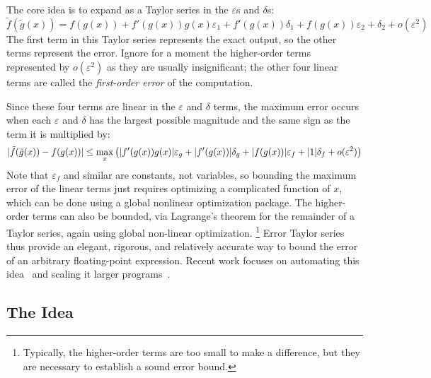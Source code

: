 \documentclass[paper.tex]{subfiles}
\begin{document}
The core idea is to expand 
  as a Taylor series in the $\varepsilon$s and $\delta$s:
\[
\tilde{f}(\tilde{g}(x)) =
f(g(x)) + f'(g(x))g(x)\varepsilon_1 + f'(g(x))\delta_1
+ f(g(x))\varepsilon_2 + \delta_2 + o(\varepsilon^2)
\]
The first term in this Taylor series represents the exact output,
  so the other terms represent the error.
Ignore for a moment the higher-order terms represented by $o(\varepsilon^2)$ as
  they are usually insignificant;
  the other four linear terms are called
  the \textit{first-order error} of the computation.

Since these four terms are linear
  in the $\varepsilon$ and $\delta$ terms,
  the maximum error occurs
  when each $\varepsilon$ and $\delta$
  has the largest possible magnitude
  and the same sign as the term it is multiplied by:
\begin{equation}\label{taylorform}
|\tilde{f}(\tilde{g}(x)) - f(g(x))| \le
\max_x \left( |f'(g(x))g(x)| \varepsilon_g \\ +
|f'(g(x))| \delta_g +
|f(g(x))| \varepsilon_f +
| 1 | \delta_f + o(\varepsilon^2) \right)
\end{equation}
Note that $\varepsilon_f$ and similar are constants, not variables,
  so bounding the maximum error of the linear terms
  just requires optimizing a complicated function of $x$,
  which can be done using a global nonlinear optimization package.
The higher-order terms can also be bounded,
  via Lagrange's theorem for the remainder of a Taylor series,
  again using global non-linear optimization.%
\footnote{
  Typically, the higher-order terms are too small to make a difference,
    but they are necessary to establish a sound error bound.}
Error Taylor series thus provide
  an elegant, rigorous, and relatively accurate way
  to bound the error of an arbitrary floating-point expression.
Recent work
  focuses on automating this idea~\cite{fptaylor}
  and scaling it larger programs~\cite{satire}.

\subsection{The Idea}
\end{document}
